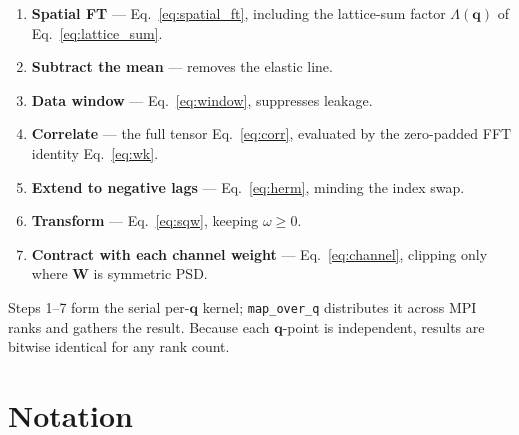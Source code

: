 \documentclass[12pt, a4paper, oneside]{article}
\newcommand{\qvec}{\mathbf{q}}
\newcommand{\Wmat}{\mathbf{W}}
\begin{document}
\begin{enumerate}
    \item \textbf{Spatial FT} --- Eq.~\eqref{eq:spatial_ft}, including the
    lattice-sum factor $\Lambda(\qvec)$ of Eq.~\eqref{eq:lattice_sum}.
    \item \textbf{Subtract the mean} --- removes the elastic line.
    \item \textbf{Data window} --- Eq.~\eqref{eq:window}, suppresses leakage.
    \item \textbf{Correlate} --- the full tensor Eq.~\eqref{eq:corr}, evaluated
    by the zero-padded FFT identity Eq.~\eqref{eq:wk}.
    \item \textbf{Extend to negative lags} --- Eq.~\eqref{eq:herm}, minding the
    index swap.
    \item \textbf{Transform} --- Eq.~\eqref{eq:sqw}, keeping $\omega \ge 0$.
    \item \textbf{Contract with each channel weight} --- Eq.~\eqref{eq:channel},
    clipping only where $\Wmat$ is symmetric PSD.
\end{enumerate}

Steps 1--7 form the serial per-$\qvec$ kernel; \texttt{map\_over\_q}
distributes it across MPI ranks and gathers the result. Because each
$\qvec$-point is independent, results are bitwise identical for any rank count.

\section{Notation}
\end{document}
